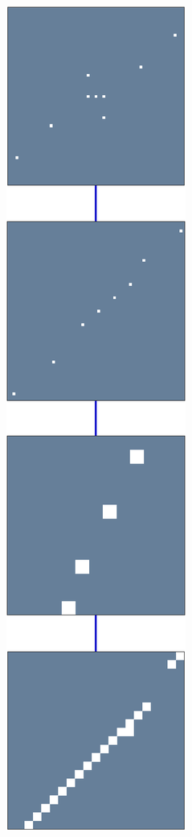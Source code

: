 \begin{figure}[!ht]
\begin{subfigure}[b]{0.085\textwidth}
\includegraphics[width=\textwidth]{figures/variable_support/support.pdf}

\end{subfigure}
\end{figure}
